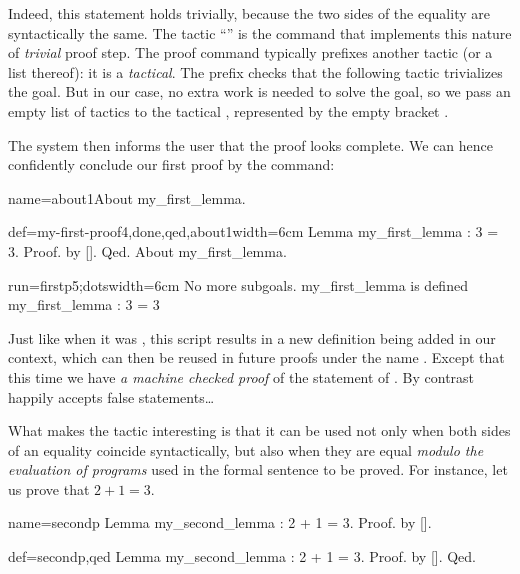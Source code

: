 Indeed, this statement holds trivially, because the two sides of
the equality are syntactically the same. The tactic ``'' is
the command that
implements this nature of \emph{trivial} proof step. The proof command
 typically prefixes another tactic (or a list thereof): it is
a \emph{tactical}. The  prefix checks that the following tactic
trivializes the goal. But in our case, no extra work is needed to
solve the goal, so we pass an empty list of tactics to the tactical
, represented by the empty bracket \C{[]}.


The system then informs the user that the proof looks complete. We can hence
confidently conclude our first proof by the  command:

\begin{coqdef}{name=about1}About my_first_lemma.\end{coqdef}
\begin{coq-left}{def=my-first-proof4,done,qed,about1}{width=6cm}
Lemma my_first_lemma : 3 = 3.
Proof. by []. Qed.
About my_first_lemma.
\end{coq-left}
\begin{coqout-right}{run=firstp5;dots}{width=6cm}
No more subgoals.
my_first_lemma is defined
my_first_lemma : 3 = 3
\end{coqout-right}

Just like when it was , this script results in a new definition
being
added in our context, which can then be reused in future proofs under
the name .
Except that this time we have \emph{a machine checked proof} of
the statement of .  By contrast
 happily accepts false statements\dots
{}

What makes the   tactic interesting is that it
can be used not only when both
sides of an equality coincide syntactically, but also when they are
equal \emph{modulo the evaluation of programs} used in the formal
sentence to be proved.
For instance, let us prove that $2 + 1 = 3$.

\begin{coqdef}{name=secondp}
Lemma my_second_lemma : 2 + 1 = 3.
Proof. by [].
\end{coqdef}
\begin{coq}{def=secondp,qed}{}
Lemma my_second_lemma : 2 + 1 = 3.
Proof. by []. Qed.
\end{coq}

